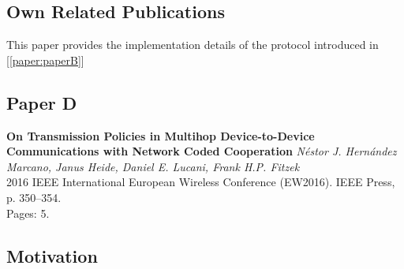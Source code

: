 \subsection*{Own Related Publications}
This paper provides the implementation details of the protocol introduced in [\ref{paper:paperB}]
\clearpage


\subsection{Paper D}
\textbf{On Transmission Policies in Multihop Device-to-Device Communications
with Network Coded Cooperation}
\textit{N\'estor J. Hern\'andez Marcano, Janus Heide, Daniel E. Lucani, Frank H.P. Fitzek}
\\  2016 IEEE International European Wireless Conference (EW2016). IEEE Press, p. 350--354.
\\ Pages: 5.
\subsection*{Motivation}

